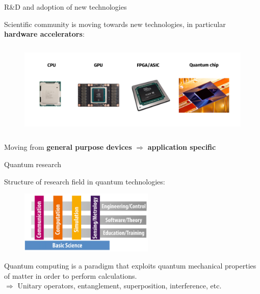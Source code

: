 \documentclass[aspectratio=169, 8pt, xcolor={svgnames}, hyperref={linkcolor=black}]{beamer}
\begin{document}
\begin{frame}{R\&D and adoption of new technologies}

   Scientific community is moving towards new technologies, in particular \textbf{\color{blue}hardware
   accelerators}:

   \vspace{-0.5cm}
   \begin{figure}
     \includegraphics[height=4.5cm]{figures/timeline.png}
   \end{figure}

   \vspace{-1cm}
   \begin{center}
     Moving from \textbf{\color{magenta}general purpose devices} $\Rightarrow$ \textbf{\color{teal}application specific}
   \end{center}

 \end{frame}

 \begin{frame}{Quantum research}

   Structure of research field in {\color{blue}quantum technologies}:
   \begin{figure}
     \includegraphics[height=3cm]{figures/rfqt.png}
   \end{figure}

   {\color{blue}Quantum computing} is a paradigm that exploits quantum mechanical properties of
   matter in order to perform calculations.\\
   $\Rightarrow$ Unitary operators, entanglement, superposition, interference, etc.

 \end{frame}
\end{document}
